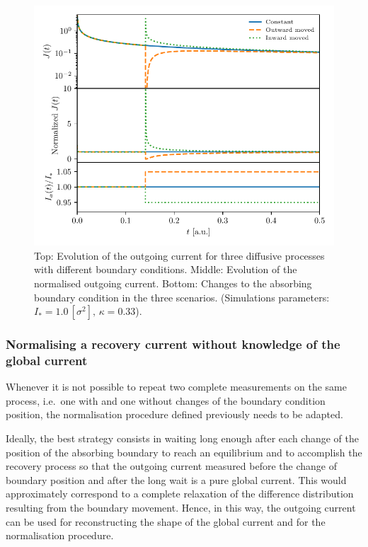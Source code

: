 \begin{figure}[htp]
    \centering
    \includegraphics[width=\textwidth]{4_probing_the_diffusive_behavior/figs/final/global_vs_moving_current.pdf}
    \caption{Top: Evolution of the outgoing current for three diffusive processes with different boundary conditions. Middle: Evolution of the normalised outgoing current. Bottom: Changes to the absorbing boundary condition in the three scenarios. (Simulations parameters: $I_\ast = 1.0\,[\sigma^2], \, \kappa = 0.33$).}
    \label{fig:fixed-vs-moved-boundary}
\end{figure}


\subsubsection{Normalising a recovery current without knowledge of the global current}


Whenever it is not possible to repeat two complete measurements on the same process, i.e.\ one with and one without changes of the boundary condition position, the normalisation procedure defined previously needs to be adapted.

Ideally, the best strategy consists in waiting long enough after each change of the position of the absorbing boundary to reach an equilibrium and to accomplish the recovery process so that the outgoing current measured before the change of boundary position and after the long wait is a pure global current. This would approximately correspond to a complete relaxation of the difference distribution resulting from the boundary movement. Hence, in this way, the outgoing current can be used for reconstructing the shape of the global current and for the normalisation procedure.

